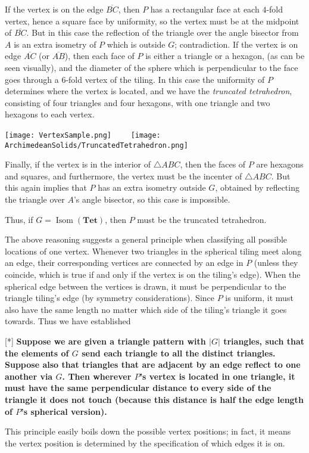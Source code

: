 \documentclass[leqno]{book}
\begin{document}
If the vertex is on the edge $\overline{BC}$, then $P$ has a rectangular face at each $4$-fold vertex, hence a square face by uniformity, so the vertex must be at the midpoint of $\overline{BC}$.  But in this case the reflection of the triangle over the angle bisector from $A$ is an extra isometry of $P$ which is outside $G$; contradiction.  If the vertex is on edge $\overline{AC}$ (or $\overline{AB}$), then each face of $P$ is either a triangle or a hexagon, (as can be seen visually), and the diameter of the sphere which is perpendicular to the face goes through a $6$-fold vertex of the tiling.  In this case the uniformity of $P$ determines where the vertex is located, and we have the \emph{truncated tetrahedron}, consisting of four triangles and four hexagons, with one triangle and two hexagons to each vertex.
\begin{center}
\texttt{[image: VertexSample.png]}~~~~
\texttt{[image: ArchimedeanSolids/TruncatedTetrahedron.png]}
\end{center}
Finally, if the vertex is in the interior of $\triangle ABC$, then the faces of $P$ are hexagons and squares, and furthermore, the vertex must be the incenter of $\triangle ABC$.  But this again implies that $P$ has an extra isometry outside $G$, obtained by reflecting the triangle over $A$'s angle bisector, so this case is impossible.

Thus, if $G=\operatorname{Isom}(\mathbf{Tet})$, then $P$ must be the truncated tetrahedron.

The above reasoning suggests a general principle when classifying all possible locations of one vertex.  Whenever two triangles in the spherical tiling meet along an edge, their corresponding vertices are connected by an edge in $P$ (unless they coincide, which is true if and only if the vertex is on the tiling's edge).  When the spherical edge between the vertices is drawn, it must be perpendicular to the triangle tiling's edge (by symmetry considerations).  Since $P$ is uniform, it must also have the same length no matter which side of the tiling's triangle it goes towards.  Thus we have established
\begin{center}
[*] \textbf{Suppose we are given a triangle pattern with $|G|$ triangles, such that the elements of $G$ send each triangle to all the distinct triangles. %
Suppose also that triangles that are adjacent by an edge reflect to one another via $G$.  Then wherever $P$'s vertex is located in one triangle, it must have the same perpendicular distance to every side of the triangle it does not touch (because this distance is half the edge length of $P$'s spherical version).}
\end{center}
This principle easily boils down the possible vertex positions; in fact, it means the vertex position is determined by the specification of which edges it is on.
\end{document}
